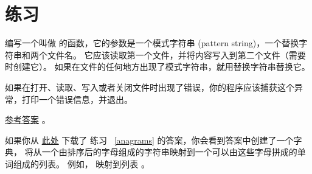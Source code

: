 {{{{{{{\begin{description}
{{  

\end{description}


\section{练习}

\begin{exercise}


编写一个叫做  的函数，它的参数是一个模式字符串 (pattern string)，一个替换字符串和两个文件名。
它应该读取第一个文件，并将内容写入到第二个文件（需要时创建它）。
如果在文件的任何地方出现了模式字符串，就用替换字符串替换它。


如果在打开、读取、写入或者关闭文件时出现了错误，你的程序应该捕获这个异常，打印一个错误信息，并退出。

\href{http://thinkpython2.com/code/sed.py}{参考答案} 。

\end{exercise}

\begin{exercise}


如果你从 \href{http://thinkpython2.com/code/anagram_sets.py}{此处} 下载了
练习~ \ref{anagrams} 的答案，你会看到答案中创建了一个字典，
将从一个由排序后的字母组成的字符串映射到一个可以由这些字母拼成的单词组成的列表。
例如，  映射到列表
  。


\end{exercise}}}}}}}}
